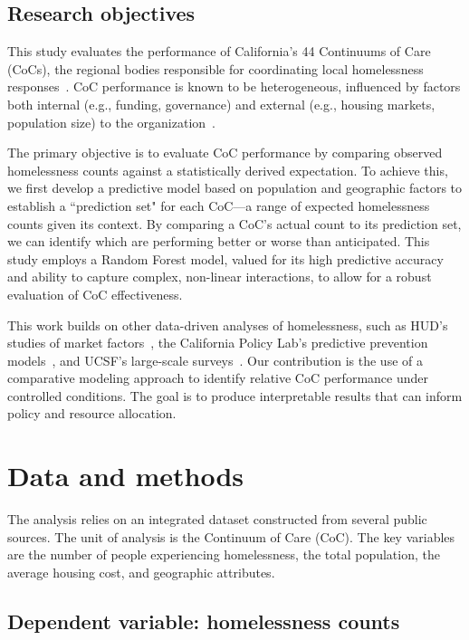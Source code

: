 \documentclass[12pt]{scrartcl}
\begin{document}
\subsection{Research objectives}

This study evaluates the performance of California's 44 Continuums of Care (CoCs), the regional bodies responsible for coordinating local homelessness responses~\cite{huduser2000coc}. CoC performance is known to be heterogeneous, influenced by factors both internal (e.g., funding, governance) and external (e.g., housing markets, population size) to the organization~\cite{preprints2025coc}.

The primary objective is to evaluate CoC performance by comparing observed homelessness counts against a statistically derived expectation. To achieve this, we first develop a predictive model based on population and geographic factors to establish a ``prediction set" for each CoC—a range of expected homelessness counts given its context. By comparing a CoC's actual count to its prediction set, we can identify which are performing better or worse than anticipated. This study employs a Random Forest model, valued for its high predictive accuracy and ability to capture complex, non-linear interactions, to allow for a robust evaluation of CoC effectiveness.

This work builds on other data-driven analyses of homelessness, such as HUD's studies of market factors~\cite{huduser2019market}, the California Policy Lab's predictive prevention models~\cite{capolicylab2025hpu}, and UCSF's large-scale surveys~\cite{ucsf2025studies}. Our contribution is the use of a comparative modeling approach to identify relative CoC performance under controlled conditions. The goal is to produce interpretable results that can inform policy and resource allocation.

\section{Data and methods}

The analysis relies on an integrated dataset constructed from several public sources. The unit of analysis is the Continuum of Care (CoC). The key variables are the number of people experiencing homelessness, the total population, the average housing cost, and geographic attributes.

\subsection{Dependent variable: homelessness counts}
\end{document}
